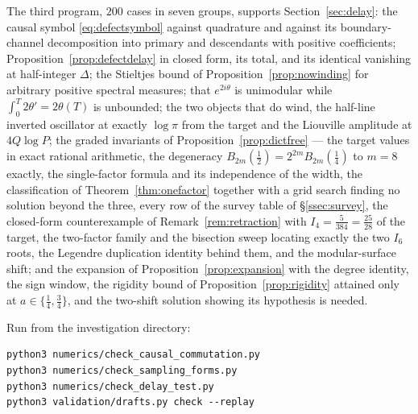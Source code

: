 The third program, $200$ cases in seven groups, supports
Section~\ref{sec:delay}: the causal symbol \eqref{eq:defectsymbol} against
quadrature and against its boundary-channel decomposition into primary and
descendants with positive coefficients; Proposition~\ref{prop:defectdelay} in
closed form, its total, and its identical vanishing at half-integer $\Delta$; the
Stieltjes bound of Proposition~\ref{prop:nowinding} for arbitrary positive
spectral measures; that $e^{2i\theta}$ is unimodular while
$\int_0^T2\theta'=2\theta(T)$ is unbounded; the two objects that do wind, the
half-line inverted oscillator at exactly $\log\pi$ from the target and the
Liouville amplitude at $4Q\log P$; the graded invariants of
Proposition~\ref{prop:dictfree} --- the target values in exact rational
arithmetic, the degeneracy $B_{2m}(\frac12)=2^{2m}B_{2m}(\frac14)$ to $m=8$
exactly, the single-factor formula and its independence of the width, the
classification of Theorem~\ref{thm:onefactor} together with a grid search finding
no solution beyond the three, every row of the survey table of
\S\ref{ssec:survey}, the closed-form counterexample of
Remark~\ref{rem:retraction} with $I_4=\frac5{384}=\frac{25}{28}$ of the target,
the two-factor family and the bisection sweep locating exactly the two $I_6$
roots, the Legendre duplication identity behind them, and the modular-surface
shift; and the expansion of
Proposition~\ref{prop:expansion} with the degree identity, the sign window, the
rigidity bound of Proposition~\ref{prop:rigidity} attained only at
$a\in\{\frac14,\frac34\}$, and the two-shift solution showing its hypothesis is
needed.

Run from the investigation directory:
\begin{verbatim}
python3 numerics/check_causal_commutation.py
python3 numerics/check_sampling_forms.py
python3 numerics/check_delay_test.py
python3 validation/drafts.py check --replay
\end{verbatim}

